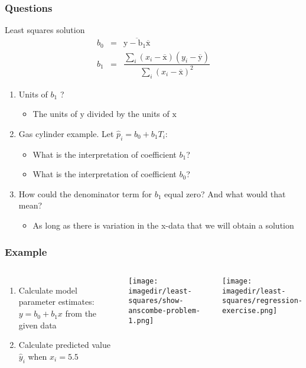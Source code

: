 \begin{frame}\frametitle{Questions}
	\begin{block}{Least squares solution}
			$$
			\begin{array}{rcl}
				b_0 &=& \overline{\mathrm{y - b_1\overline{\mathrm{x}}}} \\
				b_1 &=& \dfrac{ \sum_i{\left(x_i - \overline{\mathrm{x}}\right)\left(y_i - \overline{\mathrm{y}}\right) } }{ \sum_i{\left( x_i - \overline{\mathrm{x}}\right)^2} }
			\end{array}
			$$
	\end{block}
	\begin{enumerate}
		\item	Units of $b_1$ ?
		\begin{itemize}
			\item	The units of $\mathrm{y}$ divided by the units of $\mathrm{x}$
		\end{itemize}
		\item	Gas cylinder example. Let $\hat{p}_i = b_0 + b_1 T_i$:
		\begin{itemize}
			\item	What is the interpretation of coefficient $b_1$?
			\item	What is the interpretation of coefficient $b_0$?
		\end{itemize}
		\item	How could the denominator term for $b_1$ equal zero? And what would that mean?
		\begin{itemize}
			\item	As long as there is variation in the x-data that we will obtain a solution
		\end{itemize}
	\end{enumerate}
\end{frame}

\begin{frame}\frametitle{Example}
	\begin{columns}
		\column{5cm}
			\begin{enumerate}
				\item	Calculate model parameter estimates: $y = b_0 + b_1 x$ from the given data
				\item	Calculate predicted value $\hat{y}_i$ when $x_i = 5.5$
			\end{enumerate}
			\begin{center}
				\texttt{[image: \\imagedir/least-squares/show-anscombe-problem-1.png]}
			\end{center}
		\column{5cm}
			\begin{center}
				\texttt{[image: \\imagedir/least-squares/regression-exercise.png]}
			\end{center}
	\end{columns}
\end{frame}

